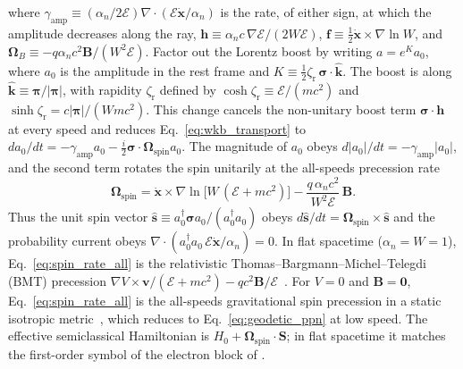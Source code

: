 \documentclass[aps,prd,onecolumn,tightenlines,nofootinbib,notitlepage,11pt,floatfix]{revtex4-2}
\theoremstyle{indentedtheorem}
\begin{document}
where $\gamma_\text{amp} \equiv (\alpha_n/2\mathcal{E})\nabla\cdot(\mathcal{E}\dot{\mathbf{x}}/\alpha_n)$ is the rate, of either sign, at which the amplitude decreases along the ray, $\mathbf{h} \equiv \alpha_n c\,\nabla\mathcal{E}/(2W\mathcal{E})$, $\mathbf{f} \equiv \tfrac{1}{2}\dot{\mathbf{x}}\times\nabla\ln W$, and $\boldsymbol{\Omega}_B \equiv -q\alpha_n c^2\mathbf{B}/(W^2\mathcal{E})$. Factor out the Lorentz boost by writing $a = e^K a_0$, where $a_0$ is the amplitude in the rest frame and $K \equiv \tfrac{1}{2}\zeta_\text{r}\,\boldsymbol{\sigma}\cdot\hat{\mathbf{k}}$. The boost is along $\hat{\mathbf{k}} \equiv \boldsymbol{\pi}/|\boldsymbol{\pi}|$, with rapidity $\zeta_\text{r}$ defined by $\cosh\zeta_\text{r} \equiv \mathcal{E}/(mc^2)$ and $\sinh\zeta_\text{r} = c|\boldsymbol{\pi}|/(Wmc^2)$. This change cancels the non-unitary boost term $\boldsymbol{\sigma}\cdot\mathbf{h}$ at every speed and reduces Eq.~\eqref{eq:wkb_transport} to $da_0/dt = -\gamma_\text{amp} a_0 - \tfrac{i}{2}\boldsymbol{\sigma}\cdot\boldsymbol{\Omega}_\text{spin}a_0$. The magnitude of $a_0$ obeys $d|a_0|/dt=-\gamma_\text{amp}|a_0|$, and the second term rotates the spin unitarily at the all-speeds precession rate
\begin{equation}
    \boldsymbol{\Omega}_\text{spin} = \dot{\mathbf{x}}\times\nabla\ln\big[W\,(\mathcal{E}+mc^2)\big] - \frac{q\,\alpha_nc^2}{W^2\mathcal{E}}\,\mathbf{B} .
    \label{eq:spin_rate_all}
\end{equation}
Thus the unit spin vector $\hat{\mathbf{s}} \equiv a_0^\dagger\boldsymbol{\sigma}a_0/(a_0^\dagger a_0)$ obeys $d\hat{\mathbf{s}}/dt = \boldsymbol{\Omega}_\text{spin}\times\hat{\mathbf{s}}$ and the probability current obeys $\nabla\cdot(a_0^\dagger a_0\,\mathcal{E}\dot{\mathbf{x}}/\alpha_n)=0$. In flat spacetime ($\alpha_n=W=1$), Eq.~\eqref{eq:spin_rate_all} is the relativistic Thomas--Bargmann--Michel--Telegdi (BMT) precession $\nabla V\times\mathbf{v}/(\mathcal{E}+mc^2) - qc^2\mathbf{B}/\mathcal{E}$~\citep{BolteKeppeler1999Semiclassical,Keppeler2003Semiclassical}. For $V=0$ and $\mathbf{B}=\mathbf{0}$, Eq.~\eqref{eq:spin_rate_all} is the all-speeds gravitational spin precession in a static isotropic metric~\citep{SilenkoTeryaev2005Semiclassical,ObukhovSilenkoTeryaev2011Dirac,OanceaKumar2023Semiclassical}, which reduces to Eq.~\eqref{eq:geodetic_ppn} at low speed. The effective semiclassical Hamiltonian is $H_0+\boldsymbol{\Omega}_\text{spin}\cdot\mathbf{S}$; in flat spacetime it matches the first-order symbol of the electron block of \citet{PanatiSpohnTeufel2003Space}.
\end{document}
